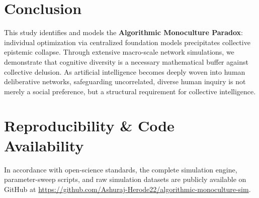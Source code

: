 \documentclass[10pt,twocolumn]{article}
\begin{document}
\section{Conclusion}
This study identifies and models the \textbf{Algorithmic Monoculture Paradox}: individual optimization via centralized foundation models precipitates collective epistemic collapse. Through extensive macro-scale network simulations, we demonstrate that cognitive diversity is a necessary mathematical buffer against collective delusion. As artificial intelligence becomes deeply woven into human deliberative networks, safeguarding uncorrelated, diverse human inquiry is not merely a social preference, but a structural requirement for collective intelligence.

\section*{Reproducibility \& Code Availability}
In accordance with open-science standards, the complete simulation engine, parameter-sweep scripts, and raw simulation datasets are publicly available on GitHub at \url{https://github.com/Ashuraj-Herode22/algorithmic-monoculture-sim}.



\end{document}
